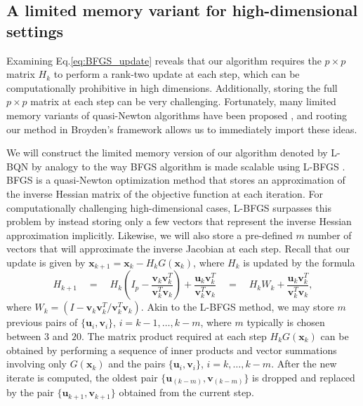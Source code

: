 \documentclass{statsoc}
\newcommand{\bu}{\boldsymbol{u}}
\newcommand{\bv}{\boldsymbol{v}}
\newcommand{\bx}{\boldsymbol{x}}
\begin{document}
\subsection{A limited memory variant for high-dimensional settings} 
Examining Eq.\eqref{eq:BFGS_update} reveals that our algorithm requires the $p \times p$ matrix $H_{k}$ to perform a rank-two update at each step, which can be computationally prohibitive in high dimensions. Additionally, storing the full $p \times p$ matrix at each step can be very challenging. Fortunately, many limited memory variants of  quasi-Newton algorithms have been proposed \citep{shanno1978conjugate,nocedal1980updating,griewank1982partitioned}, and rooting our method in Broyden's  framework allows us to immediately import these ideas. 

We will construct the limited memory version of our algorithm denoted by L-BQN by analogy to the way BFGS algorithm is made scalable using L-BFGS \citep{liu1989limited}. BFGS \citep{fletcher2013practical} is a quasi-Newton optimization method that stores an approximation of the inverse Hessian matrix of the objective function at each iteration. For computationally challenging high-dimensional cases, L-BFGS surpasses this problem by instead storing only a few vectors that represent the inverse Hessian approximation implicitly. Likewise, we will also store a pre-defined $m$ number of vectors that will approximate the inverse Jacobian at each step. Recall that our update is given by $\bx_{k+1} = \bx_k - H_k G(\bx_k)$, where $H_{k}$ is updated by the formula
\[
    H_{k+1} \quad=\quad H_{k}\left(I_p - \dfrac{\bv_k \bv_k^T}{\bv_k^T \bv_k}\right) + \dfrac{\bu_k \bv_k^T}{\bv_k^T \bv_k} \quad=\quad H_k W_k +\dfrac{\bu_k \bv_k^T}{\bv_k^T \bv_k},
\]
where $W_k = \left( I- \bv_k \bv_k^T/\bv_k^T \bv_k\right)$. Akin to the L-BFGS method, we may store $m$ previous pairs of $\{\bu_i, \bv_i\}$, $i = k-1, \dots , k-m$, where $m$ typically is chosen between $3$ and $20$. The matrix product required at each step $H_k G(\bx_k)$ can be obtained by performing a sequence of inner products and vector summations involving only $G(\bx_k)$ and the pairs $\{\bu_i, \bv_i\}$, $i = k, \dots, k-m$. After the new iterate is computed, the oldest pair $\{\bu_{(k-m)}, \bv_{(k-m)}\}$ is dropped and replaced by the pair $\{\bu_{k+1}, \bv_{k+1}\}$ obtained from the current step. %
\end{document}
